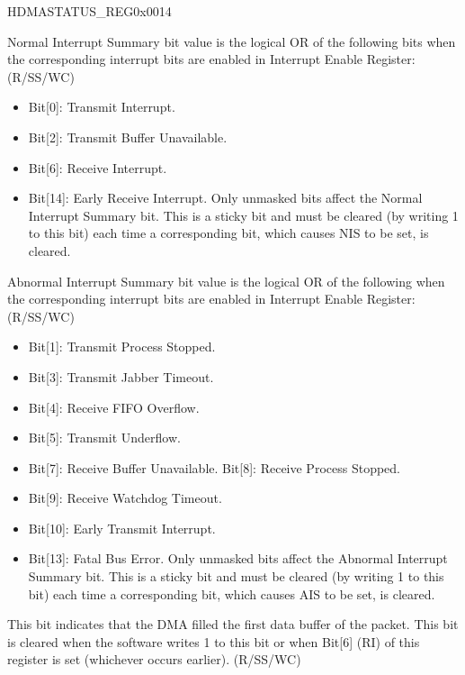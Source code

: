 \addtocounter{Regfloat}{-1}
\begin{register}{H}{DMASTATUS\_REG}{0x0014}
\begin{regdesc}\begin{reglist}
\item [Continued from the previous page...]
\item [NORM\_INT\_SUMM]Normal Interrupt Summary bit value is the logical OR of the following bits when the corresponding interrupt bits are enabled in Interrupt Enable Register:(R/SS/WC) \begin{itemize}
\item Bit[0]: Transmit Interrupt.\item Bit[2]: Transmit Buffer Unavailable.\item Bit[6]: Receive Interrupt.\item Bit[14]: Early Receive Interrupt. Only unmasked bits affect the Normal Interrupt Summary bit. This is a sticky bit and must be cleared (by writing 1 to this bit) each time a corresponding bit, which causes NIS to be set, is cleared. \end{itemize}
\item [ABN\_INT\_SUMM]Abnormal Interrupt Summary bit value is the logical OR of the following when the corresponding interrupt bits are enabled in Interrupt Enable Register: (R/SS/WC)\begin{itemize} \item Bit[1]: Transmit Process Stopped. \item  Bit[3]: Transmit Jabber Timeout. \item Bit[4]: Receive FIFO Overflow. \item  Bit[5]: Transmit Underflow.\item  Bit[7]: Receive Buffer Unavailable. Bit[8]: Receive Process Stopped.\item  Bit[9]: Receive Watchdog Timeout.\item Bit[10]: Early Transmit Interrupt. \item Bit[13]: Fatal Bus Error. Only unmasked bits affect the Abnormal Interrupt Summary bit. This is a sticky bit and must be cleared (by writing 1 to this bit) each time a corresponding bit, which causes AIS to be set, is cleared.\end{itemize}
\item [EARLY\_RECV\_INT]This bit indicates that the DMA filled the first data buffer of the packet. This bit is cleared when the software writes 1 to this bit or when Bit[6] (RI) of this register is set (whichever occurs earlier). (R/SS/WC)

\end{reglist}
\end{regdesc}
\end{register}
